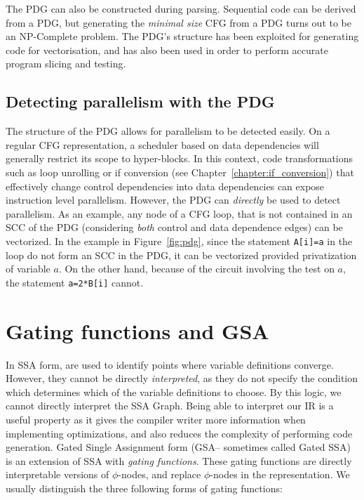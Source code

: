 The PDG can also be constructed during parsing. 
Sequential code can be derived from a PDG, but generating the {\it minimal size} CFG from a PDG turns out to be an NP-Complete problem. 
The PDG's structure has been exploited for generating code for vectorisation, and has also been used in order to perform accurate program slicing and testing.


\subsection{Detecting parallelism with the PDG}
The structure of the PDG allows for parallelism to be detected easily. 
On a regular CFG representation, a scheduler based on data dependencies will generally restrict its scope to hyper-blocks. 
In this context, code transformations such as loop unrolling or if conversion (see Chapter~\ref{chapter:if_conversion}) that effectively change control dependencies into data dependencies can expose instruction level parallelism. 
However, the PDG can \textit{directly} be used to detect parallelism. 
As an example, any node of a CFG loop, that is not contained in an SCC of the PDG (considering \textit{both} control and data dependence edges) can be vectorized. 
In the example in Figure~\ref{fig:pdg}, since the statement \texttt{A[i]=a} in the loop do not form an SCC in the PDG, it can be vectorized provided privatization of variable $a$. 
On the other hand, because of the circuit involving the test on $a$, the statement \texttt{a=2*B[i]} cannot.


\section{Gating functions and GSA}
\label{sec:gating_functions}
In SSA form, \phifuns are used to identify points where variable definitions converge. 
However, they cannot be directly \textit{interpreted}, as they do not specify the condition which determines which of the variable definitions to choose. 
By this logic, we cannot directly interpret the SSA Graph. 
Being able to interpret our IR is a useful property as it gives the compiler writer more information when implementing optimizations, and also reduces the complexity of performing code generation. 
Gated Single Assignment form (GSA-- sometimes called Gated SSA) is an extension of SSA with \textit{gating functions}. 
These gating functions are directly interpretable versions of $\phi$-nodes, and replace $\phi$-nodes in the representation. 
We usually distinguish the three following forms of gating functions:


